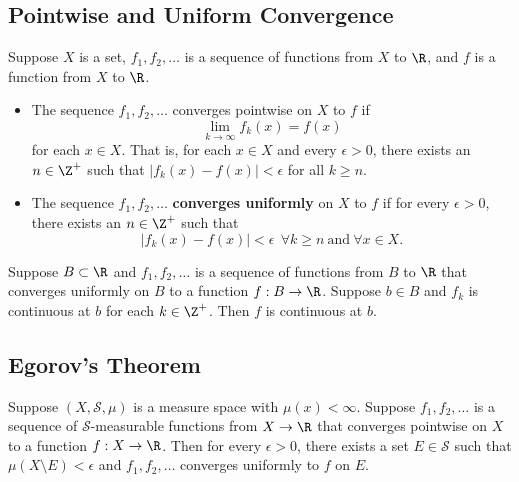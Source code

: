 \subsection{Pointwise and Uniform Convergence}

\begin{definition}
    Suppose \( X  \) is a set, \( {f}_{1}, {f}_{2}, \dots  \) is a sequence of functions from \( X  \) to \( \R  \), and \( f  \) is a function from \( X  \) to \( \R  \).
    \begin{itemize}
        \item The sequence \( {f}_{1}, {f}_{2}, \dots  \) converges pointwise on \( X  \) to \( f  \) if 
            \[  \lim_{ k  \to  \infty  }  {f}_{k }(x) = f(x)  \]
            for each \( x \in X  \). That is, for each \( x \in X  \) and every \( \epsilon > 0  \), there exists an \( n \in \Z^{+} \) such that \( | {f}_{k }(x) - f(x) |  < \epsilon \) for all \( k \geq n  \).
        \item The sequence \( {f}_{1}, {f}_{2}, \dots  \) \textbf{converges uniformly} on \( X  \) to \( f  \) if for every \( \epsilon > 0  \), there exists an \( n \in \Z^{+} \) such that 
            \[ | {f}_{k}(x) - f(x) |  < \epsilon \ \ \forall k \geq n \ \text{and} \ \forall x \in X. \]
    \end{itemize}
\end{definition}

\begin{prop}
    Suppose \( B \subset \R  \) and \( {f}_{1}, {f}_{2}, \dots  \) is a sequence of functions from \( B \) to \( \R  \) that converges uniformly on \( B  \) to a function \( f : B \to \R  \). Suppose \( b \in B  \) and \( {f}_{k} \) is continuous at \( b  \) for each \( k \in \Z^{+} \). Then \( f  \) is continuous at \( b \).
\end{prop}

\subsection{Egorov's Theorem}

\begin{prop}
    Suppose \( (X,\mathcal{S}, \mu) \) is a measure space with \( \mu(x) < \infty  \). Suppose \( {f}_{1}, {f}_{2}, \dots  \) is a sequence of \( \mathcal{S} \)-measurable functions from \( X \to \R  \) that converges pointwise on \( X  \) to a function \( f: X \to \R  \). Then for every \( \epsilon > 0  \), there exists a set \( E \in \mathcal{S} \) such that \( \mu (X \setminus  E ) < \epsilon  \) and \( {f}_{1}, {f}_{2}, \dots  \) converges uniformly to \( f  \) on \( E  \). 
\end{prop}

